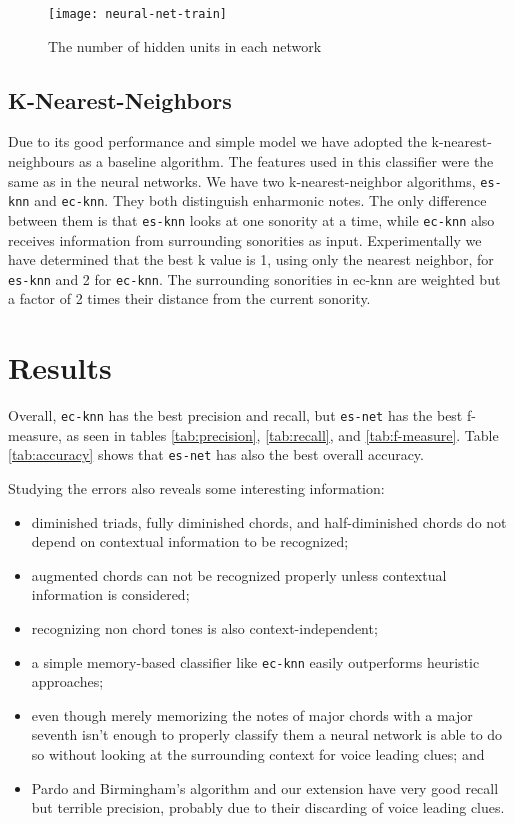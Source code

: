 \documentclass{article}
\begin{document}
\begin{figure}
  \centering
  \texttt{[image: neural-net-train]}
  \caption{The number of hidden units in each network}
  \label{fig:hidden-units}
\end{figure}


\subsection{K-Nearest-Neighbors}
\label{sec:knn}

Due to its good performance \cite{fix.ea:important,
  gomez.ea:estimating} and simple model we have adopted the
k-nearest-neighbours as a baseline algorithm. The features used in
this classifier were the same as in the neural networks. We have two
k-nearest-neighbor algorithms, \texttt{es-knn} and
\texttt{ec-knn}. They both distinguish enharmonic notes. The only
difference between them is that \texttt{es-knn} looks at one sonority
at a time, while \texttt{ec-knn} also receives information from
surrounding sonorities as input. Experimentally we have determined
that the best k value is 1, using only the nearest neighbor, for
\texttt{es-knn} and 2 for \texttt{ec-knn}. The surrounding sonorities
in ec-knn are weighted but a factor of 2 times their distance from the
current sonority.

\section{Results}
\label{sec:discussion}


Overall, \texttt{ec-knn} has the best precision and recall, but
\texttt{es-net} has the best f-measure, as seen in tables
\ref{tab:precision}, \ref{tab:recall}, and \ref{tab:f-measure}. Table
\ref{tab:accuracy} shows that \texttt{es-net} has also the best
overall accuracy.

Studying the errors also reveals some interesting information:
\begin{itemize}
\item diminished triads, fully diminished chords, and half-diminished
  chords do not depend on contextual information to be recognized;
\item augmented chords can not be recognized properly unless
  contextual information is considered;
\item recognizing non chord tones is also context-independent;
\item a simple memory-based classifier like \texttt{ec-knn}
  easily outperforms heuristic approaches;
\item even though merely memorizing the notes of major chords with a major seventh
  isn't enough to properly classify them a neural network is able to
  do so without looking at the surrounding context for voice leading
  clues; and
\item Pardo and Birmingham's algorithm and our extension have very
  good recall but terrible precision, probably due to their discarding
  of voice leading clues.
\end{itemize}
\end{document}
